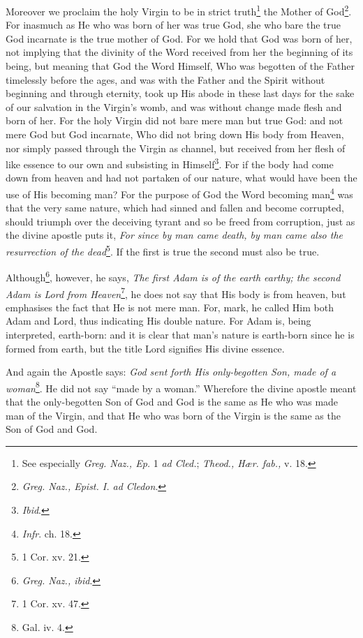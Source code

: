 Moreover we proclaim the holy Virgin to be in strict truth\footnote{See especially \emph{Greg. Naz., Ep. }1 \emph{ad Cled.}; \emph{Theod., Hær. fab., }v. 18.} the Mother of God\footnote{\emph{Greg. Naz., Epist. I. ad Cledon}.}. For inasmuch as He who was born of her was true God, she who bare the true God incarnate is the true mother of God. For we hold that God was born of her, not implying that the divinity of the Word received from her the beginning of its being, but meaning that God the Word Himself, Who was begotten of the Father timelessly before the ages, and was with the Father and the Spirit without beginning and through eternity, took up His abode in these last days for the sake of our salvation in the Virgin’s womb, and was without change made flesh and born of her. For the holy Virgin did not bare mere man but true God: and not mere God but God incarnate, Who did not bring down His body from Heaven, nor simply passed through the Virgin as channel, but received from her flesh of like essence to our own and subsisting in Himself\footnote{\emph{Ibid}.}. For if the body had come down from heaven and had not partaken of our nature, what would have been the use of His becoming man? For the purpose of God the Word becoming man\footnote{\emph{Infr}. ch. 18.} was that the very same nature, which had sinned and fallen and become corrupted, should triumph over the deceiving tyrant and so be freed from corruption, just as the divine apostle puts it, \emph{For since by man came death, by man came also the resurrection of the dead}\footnote{1 Cor. xv. 21.}. If the first is true the second must also be true.

Although\footnote{\emph{Greg. Naz., ibid}.}, however, he says, \emph{The first Adam is of the earth earthy; the second Adam is Lord from Heaven}\footnote{1 Cor. xv. 47.}, he does not say that His body is from heaven, but emphasises the fact that He is not mere man. For, mark, he called Him both Adam and Lord, thus indicating His double nature. For Adam is, being interpreted, earth-born: and it is clear that man’s nature is earth-born since he is formed from earth, but the title Lord signifies His divine essence.

And again the Apostle says: \emph{God sent forth His only-begotten Son, made of a woman}\footnote{Gal. iv. 4.}. He did not say “made by a woman.” Wherefore the divine apostle meant that the only-begotten Son of God and God is the same as He who was made man of the Virgin, and that He who was born of the Virgin is the same as the Son of God and God.

